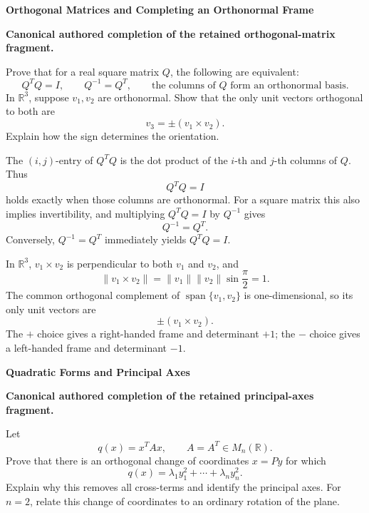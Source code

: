 \begin{problem}[CP-I-0115]
\label{prob:cp-i-0115}
\textbf{Orthogonal Matrices and Completing an Orthonormal Frame}

\textbf{Canonical authored completion of the retained orthogonal-matrix fragment.}

\hspace*{1.5em}Prove that for a real square matrix \(Q\), the following are equivalent:
\[
Q^TQ=I,\qquad Q^{-1}=Q^T,\qquad
\text{the columns of }Q\text{ form an orthonormal basis}.
\]
In \(\mathbb R^3\), suppose \(v_1,v_2\) are orthonormal. Show that the only unit vectors
orthogonal to both are
\[
v_3=\pm(v_1\times v_2).
\]
Explain how the sign determines the orientation.
\end{problem}

\begin{solution}
The \((i,j)\)-entry of \(Q^TQ\) is the dot product of the \(i\)-th and \(j\)-th columns of \(Q\).
Thus
\[
Q^TQ=I
\]
holds exactly when those columns are orthonormal. For a square matrix this also implies
invertibility, and multiplying \(Q^TQ=I\) by \(Q^{-1}\) gives
\[
Q^{-1}=Q^T.
\]
Conversely, \(Q^{-1}=Q^T\) immediately yields \(Q^TQ=I\).

In \(\mathbb R^3\), \(v_1\times v_2\) is perpendicular to both \(v_1\) and \(v_2\), and
\[
\|v_1\times v_2\|=\|v_1\|\|v_2\|\sin\frac{\pi}{2}=1.
\]
The common orthogonal complement of \(\operatorname{span}\{v_1,v_2\}\) is one-dimensional,
so its only unit vectors are
\[
\pm(v_1\times v_2).
\]
The \(+\) choice gives a right-handed frame and determinant \(+1\); the \(-\) choice gives a
left-handed frame and determinant \(-1\).
\end{solution}

\begin{problem}[CP-I-0116]
\label{prob:cp-i-0116}
\textbf{Quadratic Forms and Principal Axes}

\textbf{Canonical authored completion of the retained principal-axes fragment.}

\hspace*{1.5em}Let
\[
q(x)=x^TAx,\qquad A=A^T\in M_n(\mathbb R).
\]
Prove that there is an orthogonal change of coordinates \(x=Py\) for which
\[
q(x)=\lambda_1y_1^2+\cdots+\lambda_ny_n^2.
\]
Explain why this removes all cross-terms and identify the principal axes. For \(n=2\), relate
this change of coordinates to an ordinary rotation of the plane.
\end{problem}

